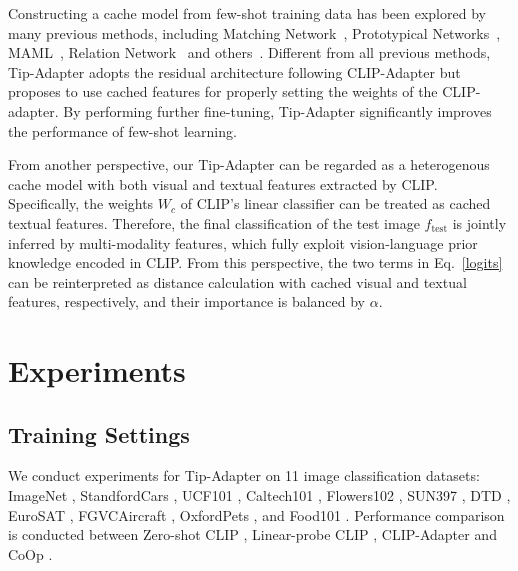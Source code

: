 \documentclass[10pt,twocolumn,letterpaper]{article}
\begin{document}
Constructing a cache model from few-shot training data has been explored by many previous methods, including Matching Network~\cite{vinyals2016matching}, Prototypical Networks~\cite{snell2017prototypical}, MAML~\cite{finn2017model}, Relation Network~\cite{sung2018learning} and others~\cite{dhillon2019baseline,chen2020new,tian2020rethinking,chen2019closer}. 
Different from all previous methods, Tip-Adapter adopts the residual architecture following CLIP-Adapter but proposes to use cached features for properly setting the weights of the CLIP-adapter. By performing further fine-tuning, Tip-Adapter significantly improves the performance of few-shot learning.

From another perspective, our Tip-Adapter can be regarded as a heterogenous cache model with both visual and textual features extracted by CLIP. Specifically, the weights $W_c$ of CLIP's linear classifier can be treated as cached textual features. Therefore, the final classification of the test image $f_\mathrm{test}$ is jointly inferred by multi-modality features, which fully exploit vision-language prior knowledge encoded in CLIP. From this perspective, the two terms in Eq.~\eqref{logits} can be reinterpreted as distance calculation with cached visual and textual features, respectively, and their importance is balanced by $\alpha$. 




\section{Experiments}
\label{sec:experiments}

\subsection{Training Settings}
We conduct experiments for Tip-Adapter on 11 image classification datasets: ImageNet \cite{deng2009imagenet}, StandfordCars \cite{krause20133d}, UCF101 \cite{soomro2012ucf101}, Caltech101 \cite{fei2004learning}, Flowers102 \cite{nilsback2008automated}, SUN397 \cite{xiao2010sun},  DTD \cite{cimpoi2014describing}, EuroSAT \cite{helber2019eurosat}, FGVCAircraft \cite{maji2013fine},  OxfordPets \cite{parkhi2012cats},  and Food101 \cite{bossard2014food}. Performance comparison is conducted between Zero-shot CLIP \cite{radford2021learning}, Linear-probe CLIP \cite{radford2021learning}, CLIP-Adapter \cite{gao2021clip} and CoOp \cite{zhou2021coop}.
\end{document}
